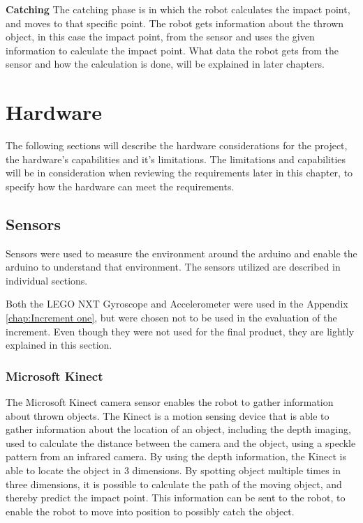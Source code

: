 \textbf{Catching}\newline
The catching phase is in which the robot calculates the impact point, and moves to that specific point. The robot gets information about the thrown object, in this case the impact point, from the sensor and uses the given information to calculate the impact point. What data the robot gets from the sensor and how the calculation is done, will be explained in later chapters. 

\section{Hardware}
\label{sec:Hardware} 
The following sections will describe the hardware considerations for the project, the hardware’s capabilities and it’s limitations. The limitations and capabilities will be in consideration when reviewing the requirements later in this chapter, to specify how the hardware can meet the requirements.

\subsection{Sensors}
\label{sec:Sensors}
Sensors were used to measure the environment around the arduino and enable the arduino to understand that environment. The sensors utilized are described in individual sections. 

Both the LEGO NXT Gyroscope and Accelerometer were used in the Appendix \ref{chap:Increment one}, but were chosen not to be used in the evaluation of the increment. Even though they were not used for the final product, they are lightly explained in this section.

\subsubsection{Microsoft Kinect}
\label{sec:Microsoft Kinect}
The Microsoft Kinect camera sensor enables the robot to gather information about thrown objects. The Kinect is a motion sensing device that is able to gather information about the location of an object, including the depth imaging, used to calculate the distance between the camera and the object, using a speckle pattern from an infrared camera. By using the depth information, the Kinect is able to locate the object in 3 dimensions.
By spotting object multiple times in three dimensions, it is possible to calculate the path of the moving object, and thereby predict the impact point. This information can be sent to the robot, to enable the robot to move into position to possibly catch the object.

